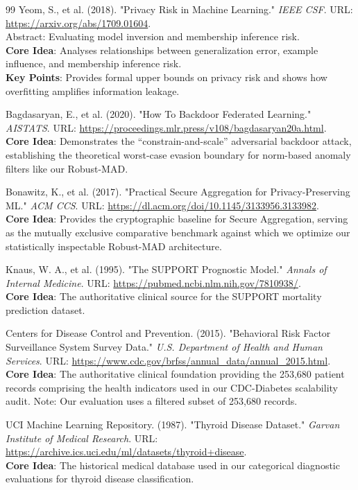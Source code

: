 \documentclass[10pt, a4paper, twocolumn]{article}
\begin{document}
\begin{thebibliography}{99}
 Yeom, S., et al. (2018). "Privacy Risk in Machine Learning." \textit{IEEE CSF}. URL: \url{https://arxiv.org/abs/1709.01604}. \\ Abstract: Evaluating model inversion and membership inference risk. \\
\textbf{Core Idea}: Analyses relationships between generalization error, example influence, and membership inference risk. \\
\textbf{Key Points}: Provides formal upper bounds on privacy risk and shows how overfitting amplifies information leakage.

 Bagdasaryan, E., et al. (2020). "How To Backdoor Federated Learning." \textit{AISTATS}. URL: \url{https://proceedings.mlr.press/v108/bagdasaryan20a.html}. \\
\textbf{Core Idea}: Demonstrates the ``constrain-and-scale'' adversarial backdoor attack, establishing the theoretical worst-case evasion boundary for norm-based anomaly filters like our Robust-MAD.

 Bonawitz, K., et al. (2017). "Practical Secure Aggregation for Privacy‑Preserving ML." \textit{ACM CCS}. URL: \url{https://dl.acm.org/doi/10.1145/3133956.3133982}. \\
\textbf{Core Idea}: Provides the cryptographic baseline for Secure Aggregation, serving as the mutually exclusive comparative benchmark against which we optimize our statistically inspectable Robust-MAD architecture.

 Knaus, W. A., et al. (1995). "The SUPPORT Prognostic Model." \textit{Annals of Internal Medicine}. URL: \url{https://pubmed.ncbi.nlm.nih.gov/7810938/}. \\
\textbf{Core Idea}: The authoritative clinical source for the SUPPORT mortality prediction dataset.

 Centers for Disease Control and Prevention. (2015). "Behavioral Risk Factor Surveillance System Survey Data." \textit{U.S. Department of Health and Human Services}. URL: \url{https://www.cdc.gov/brfss/annual_data/annual_2015.html}. \\
\textbf{Core Idea}: The authoritative clinical foundation providing the 253,680 patient records comprising the health indicators used in our CDC-Diabetes scalability audit. Note: Our evaluation uses a filtered subset of 253,680 records.

 UCI Machine Learning Repository. (1987). "Thyroid Disease Dataset." \textit{Garvan Institute of Medical Research}. URL: \url{https://archive.ics.uci.edu/ml/datasets/thyroid+disease}. \\
\textbf{Core Idea}: The historical medical database used in our categorical diagnostic evaluations for thyroid disease classification.


\end{thebibliography}
\end{document}

